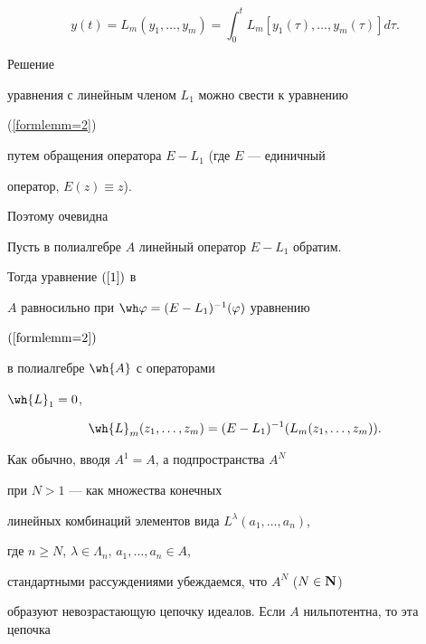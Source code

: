 \begin{equation} \label{ytLm}


y(t)=L_m(y_1,\dotsc ,y_m)=


\int\nolimits_{0}^{t}


L_m[y_1(\tau),\dotsc,y_m(\tau)]d\tau.


\end{equation}


Решение


уравнения с линейным членом $L_1$ можно свести к уравнению


(\ref{formlemm=2})


путем обращения оператора $E-L_1$ (где $E$ --- единичный


оператор, $E(z)\equiv z$).


Поэтому очевидна





\begin{lem}


\label{linlemma}


Пусть в полиалгебре $A$ линейный оператор $E-L_1$ обратим.


Тогда уравнение $(\ref{1})$ в


$A$ равносильно при $\wh\varphi=(E-L_1)^{-1}(\varphi)$ уравнению


$(\ref{formlemm=2})$


в полиалгебре $\wh{A}$ с операторами


$\wh{L}_1=0$,


\begin{equation}


\label{hatA}


\wh{L}_m(z_1,\dotsc,z_m)=(E-L_1)^{-1}(L_m(z_1,\dotsc,z_m)).


\end{equation}


\end{lem}





Как обычно, вводя $A^1=A$, а подпространства $A^N$


при $N>1$ --- как множества конечных


линейных комбинаций элементов вида $L^\lambda(a_1,\dotsc,a_n)$,


где $n\geq N$, $\lambda\in\Lambda_n$, $a_1,\dotsc, a_n\in A$,


стандартными рассуждениями убеждаемся, что $A^N$ ($N\in{\bold{N}}$)


образуют невозрастающую цепочку идеалов. Если $A$ нильпотентна, то эта цепочка


